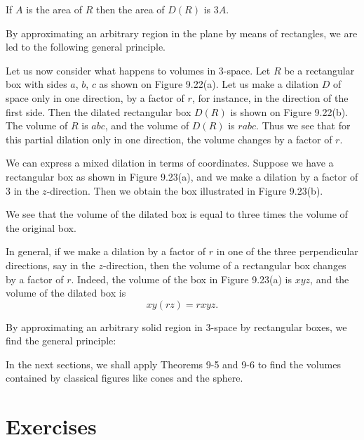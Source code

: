 \documentclass[12pt]{book} %
\begin{document}
If $A$ is the area of $R$ then the area of $D(R)$ is $3A$.

By approximating an arbitrary region in the plane by means of rectangles, we are led to the following general principle.


Let us now consider what happens to volumes in 3-space. Let $R$ be a rectangular box with sides $a$, $b$, $c$ as shown on Figure 9.22(a). Let us make a dilation $D$ of space only in one direction, by a factor of $r$, for instance, in the direction of the first side. Then the dilated rectangular box $D(R)$ is shown on Figure 9.22(b). The volume of $R$ is $abc$, and the volume of $D(R)$ is $rabc$. Thus we see that for this partial dilation only in one direction, the volume changes by a factor of $r$.


We can express a mixed dilation in terms of coordinates. Suppose we have a rectangular box as shown in Figure 9.23(a), and we make a dilation by a factor of 3 in the $z$-direction. Then we obtain the box illustrated in Figure 9.23(b).


We see that the volume of the dilated box is equal to three times the volume of the original box.

In general, if we make a dilation by a factor of $r$ in one of the three perpendicular directions, say in the $z$-direction, then the volume of a rectangular box changes by a factor of $r$. Indeed, the volume of the box in Figure 9.23(a) is $xyz$, and the volume of the dilated box is
\[
xy(rz)=rxyz.
\]

By approximating an arbitrary solid region in 3-space by rectangular boxes, we find the general principle:


In the next sections, we shall apply Theorems 9-5 and 9-6 to find the volumes contained by classical figures like cones and the sphere.

\section*{Exercises}
\end{document}
